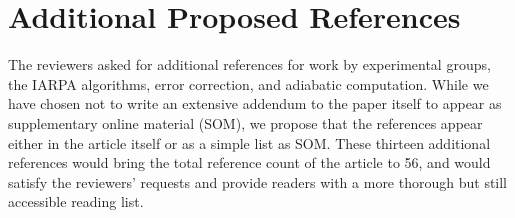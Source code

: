 \documentclass{article}
\begin{document}
\section{Additional Proposed References}

The reviewers asked for additional references for work by experimental
groups, the IARPA algorithms, error correction, and adiabatic
computation.  While we have chosen not to write an extensive addendum
to the paper itself to appear as supplementary online material (SOM),
we propose that the references appear either in the article itself or
as a simple list as SOM.  These thirteen additional references would
bring the total reference count of the article to 56, and would
satisfy the reviewers' requests and provide readers with a more
thorough but still accessible reading list.
\end{document}
